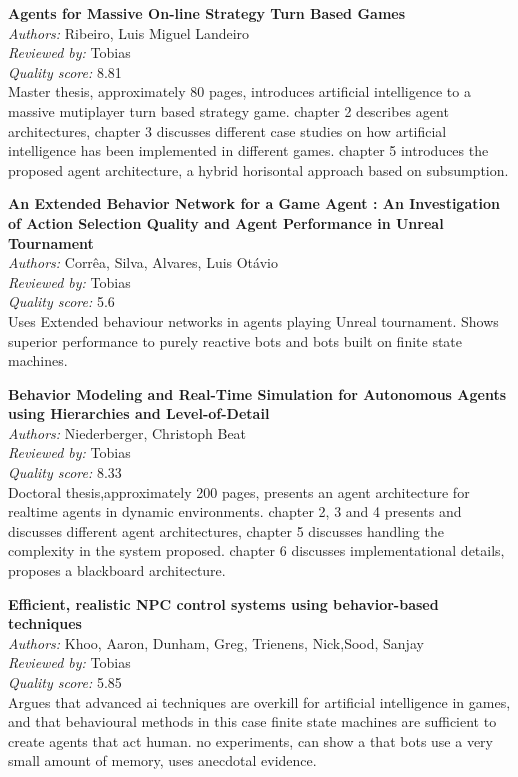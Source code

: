 {\textbf{Agents for Massive On-line Strategy Turn Based Games\cite{ribeiroagents}}\\
\textit{Authors:} Ribeiro, Luis Miguel Landeiro\\
\textit{Reviewed by:} Tobias\\
\textit{Quality score:} 8.81\\
Master thesis, approximately 80 pages, introduces artificial intelligence to a massive mutiplayer turn based strategy game. chapter 2 describes agent architectures, chapter 3 discusses different case studies on how artificial intelligence has been implemented in different games. chapter 5 introduces the proposed agent architecture, a hybrid horisontal approach based on subsumption.

\textbf{An Extended Behavior Network for a Game Agent : An Investigation of Action Selection Quality and Agent Performance in Unreal Tournament\cite{da2005extended}}\\
\textit{Authors:} Corr\^{e}a, Silva, Alvares, Luis Ot\'{a}vio\\
\textit{Reviewed by:} Tobias\\
\textit{Quality score:} 5.6\\
Uses Extended behaviour networks in agents playing Unreal tournament. Shows superior performance to purely reactive bots and bots built on finite state machines.

\textbf{Behavior Modeling and Real-Time Simulation for Autonomous Agents using Hierarchies and Level-of-Detail\cite{niederberger2005and}}\\
\textit{Authors:} Niederberger, Christoph Beat\\
\textit{Reviewed by:} Tobias\\
\textit{Quality score:} 8.33\\
Doctoral thesis,approximately 200 pages, presents an agent architecture for realtime agents in dynamic environments. chapter 2, 3 and 4 presents and discusses different agent architectures, chapter 5 discusses handling the complexity in the system proposed. chapter 6 discusses implementational details, proposes a blackboard architecture.

\textbf{Efficient, realistic NPC control systems using behavior-based techniques\cite{khoo2002efficient}}\\
\textit{Authors:} Khoo, Aaron, Dunham, Greg, Trienens, Nick,Sood, Sanjay\\
\textit{Reviewed by:} Tobias\\
\textit{Quality score:} 5.85\\
Argues that advanced ai techniques are overkill for artificial intelligence in games, and that behavioural methods in this case finite state machines are sufficient to create agents that act human. no experiments, can show a that bots use a very small amount of memory, uses  anecdotal evidence.

}

